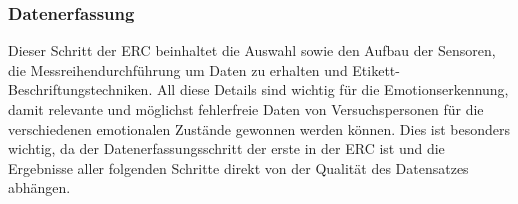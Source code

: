 \subsubsection{Datenerfassung} \label{datenerfassung-subsubsec}




Dieser Schritt der ERC beinhaltet die Auswahl sowie den Aufbau der Sensoren, die Messreihendurchführung um Daten zu erhalten und Etikett-Beschriftungstechniken.
All diese Details sind wichtig für die Emotionserkennung, damit relevante und möglichst fehlerfreie Daten von Versuchspersonen für die verschiedenen emotionalen Zustände gewonnen werden können.
Dies ist besonders wichtig, da der Datenerfassungsschritt der erste in der ERC ist und die Ergebnisse aller folgenden Schritte direkt von der Qualität des Datensatzes abhängen. \\




